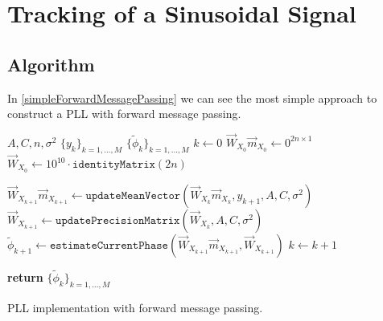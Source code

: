 \chapter{Tracking of a Sinusoidal Signal}

\section{Algorithm}

In \ref{simpleForwardMessagePassing} we can see the most simple approach to construct a PLL with forward message passing.

\begin{algorithm}
\label{simpleForwardMessagePassing}
\begin{algorithmic}[1]
\Parameters $ A, C, n, \sigma^2$
\Require $\{y_k\}_{k=1, \ldots, M}$
\Ensure $\{\tilde{\phi}_k\}_{k=1,\ldots, M}$
\State $k \gets 0$
\State $\overrightarrow{W}_{X_0}\overrightarrow{m}_{X_0} \gets  0^{2n \times 1} $
\State $\overrightarrow{W}_{X_0} \gets  10^{10} \cdot \texttt{identityMatrix}(2n) $

\State $\overrightarrow{W}_{X_{k+1}}\overrightarrow{m}_{X_{k+1}} \gets \texttt{updateMeanVector}(\overrightarrow{W}_{X_k}\overrightarrow{m}_{X_k},y_{k+1},A,C,\sigma^2)$
\State $\overrightarrow{W}_{X_{k+1}} \gets \texttt{updatePrecisionMatrix}(\overrightarrow{W}_{X_k},A,C,\sigma^2)$
\State $\tilde{\phi}_{k+1} \gets \texttt{estimateCurrentPhase}(\overrightarrow{W}_{X_{k+1}}\overrightarrow{m}_{X_{k+1}},\overrightarrow{W}_{X_{k+1}})$
\State $k \gets k+1$
\EndFor

\State \textbf{return} $\{\tilde{\phi}_k\}_{k=1,\ldots, M}$
\end{algorithmic}
\caption[Simple PLL implementation.]
{PLL implementation with forward message passing.}
\end{algorithm}

\clearpage
